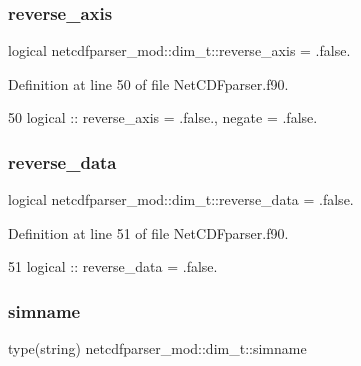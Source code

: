 \subsubsection{\texorpdfstring{reverse\+\_\+axis}{reverse\_axis}}
{\footnotesize\ttfamily logical netcdfparser\+\_\+mod\+::dim\+\_\+t\+::reverse\+\_\+axis = .false.\hspace{0.3cm}{\ttfamily [private]}}



Definition at line 50 of file Net\+C\+D\+Fparser.\+f90.


\begin{DoxyCode}
50         \textcolor{keywordtype}{logical} :: reverse\_axis = .false., negate = .false.
\end{DoxyCode}
\mbox{\label{structnetcdfparser__mod_1_1dim__t_acf99009f46de2c7f946506d74977c2c5}} 
\subsubsection{\texorpdfstring{reverse\+\_\+data}{reverse\_data}}
{\footnotesize\ttfamily logical netcdfparser\+\_\+mod\+::dim\+\_\+t\+::reverse\+\_\+data = .false.\hspace{0.3cm}{\ttfamily [private]}}



Definition at line 51 of file Net\+C\+D\+Fparser.\+f90.


\begin{DoxyCode}
51         \textcolor{keywordtype}{logical} :: reverse\_data = .false.
\end{DoxyCode}
\mbox{\label{structnetcdfparser__mod_1_1dim__t_a14ab4a777ae4e2429332ddc08f875601}} 
\subsubsection{\texorpdfstring{simname}{simname}}
{\footnotesize\ttfamily type(string) netcdfparser\+\_\+mod\+::dim\+\_\+t\+::simname\hspace{0.3cm}{\ttfamily [private]}}



